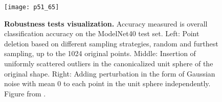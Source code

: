 \begin{figure}[!t]
    \texttt{[image: p51\_65]}
    \caption{
        \textbf{Robustness tests visualization.}
        Accuracy measured is overall classification accuracy on the ModelNet40
        test set. Left: Point deletion based on different sampling strategies,
        random and furthest sampling, up to the 1024 original points. Middle:
        Insertion of uniformly scattered outliers in the canonicalized unit
        sphere of the original shape. Right: Adding perturbation in the form of
        Gaussian noise with mean 0 to each point in the unit sphere independently.
        Figure from \cite{qi2017pointnet}.
    } \label{fig:robustness}
\end{figure}


